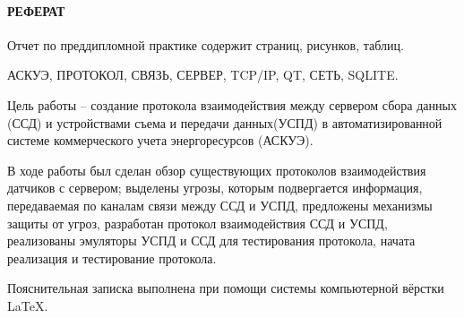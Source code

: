 \newpage
{}
\paragraph*{\hfill РЕФЕРАТ \hfill}
Отчет по преддипломной практике содержит  страниц,  рисунков,   таблиц.

АСКУЭ, ПРОТОКОЛ, СВЯЗЬ, СЕРВЕР, TCP/IP, QT, СЕТЬ, SQLITE.

Цель работы -- создание протокола взаимодействия между сервером сбора данных (ССД) и устройствами съема и передачи данных(УСПД) в автоматизированной системе коммерческого учета энергоресурсов (АСКУЭ).

В ходе работы был сделан обзор существующих протоколов взаимодействия датчиков с сервером; выделены угрозы, которым подвергается информация, передаваемая по каналам связи между ССД и УСПД, предложены механизмы защиты от угроз, разработан протокол взаимодействия ССД и УСПД, реализованы эмуляторы УСПД и ССД для тестирования протокола, начата реализация и тестирование протокола.  %

Пояснительная записка выполнена при помощи системы компьютерной вёрстки \LaTeX.
